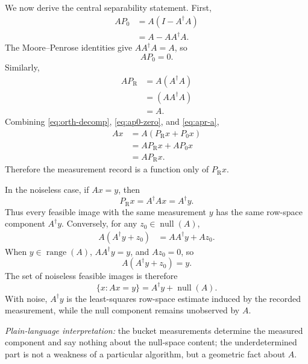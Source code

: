 \documentclass[journal]{IEEEtran}
\newcommand{\range}{\operatorname{range}}
\newcommand{\nullsp}{\operatorname{null}}
\newcommand{\pinv}{\dagger}
\newcommand{\PR}{P_{\mathrm{R}}}
\newcommand{\PZ}{P_{0}}
\begin{document}
We now derive the central separability statement.  First,
\begin{align}
    A\PZ
    &= A(I-A^\pinv A) \\
    &= A-AA^\pinv A.
\end{align}
The Moore--Penrose identities give $AA^\pinv A=A$, so
\begin{equation}
    A\PZ=0.
    \label{eq:ap0-zero}
\end{equation}
Similarly,
\begin{align}
    A\PR
    &= A(A^\pinv A)\\
    &= (AA^\pinv A)\\
    &= A.
    \label{eq:apr-a}
\end{align}
Combining \eqref{eq:orth-decomp}, \eqref{eq:ap0-zero}, and \eqref{eq:apr-a},
\begin{align}
    Ax
    &= A(\PR x+\PZ x)\\
    &= A\PR x + A\PZ x\\
    &= A\PR x.
    \label{eq:y-only-range}
\end{align}
Therefore the measurement record is a function only of $\PR x$.

In the noiseless case, if $Ax=y$, then
\begin{equation}
    \PR x = A^\pinv A x = A^\pinv y.
    \label{eq:unique-row}
\end{equation}
Thus every feasible image with the same measurement $y$ has the same row-space component $A^\pinv y$.  Conversely, for any $z_0\in\nullsp(A)$,
\begin{align}
    A(A^\pinv y+z_0)
    &= AA^\pinv y + Az_0.
\end{align}
When $y\in\range(A)$, $AA^\pinv y=y$, and $Az_0=0$, so
\begin{equation}
    A(A^\pinv y+z_0)=y.
\end{equation}
The set of noiseless feasible images is therefore
\begin{equation}
    \{x:Ax=y\} = A^\pinv y+\nullsp(A).
    \label{eq:affine-feasible}
\end{equation}
With noise, $A^\pinv y$ is the least-squares row-space estimate induced by the recorded measurement, while the null component remains unobserved by $A$.

\textit{Plain-language interpretation:} the bucket measurements determine the measured component and say nothing about the null-space content; the underdetermined part is not a weakness of a particular algorithm, but a geometric fact about $A$.
\end{document}

